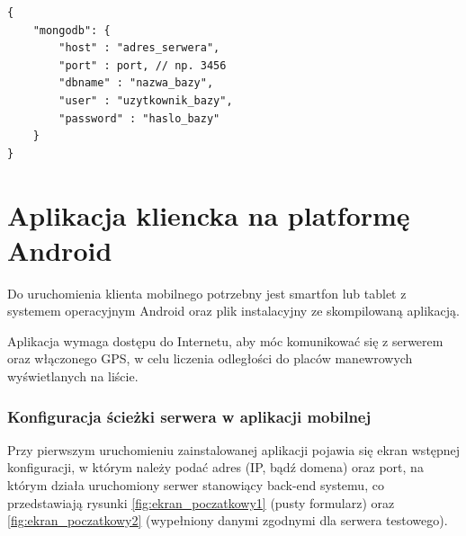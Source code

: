 \documentclass[twoside,a4paper,openright,12pt]{book}
\begin{document}
\begin{lstlisting}[frame=single,label={lst:dbconfig},caption=Domyślna zawartość pliku z konfiguracją połączenia do bazy danych -- plik: /config.json]
{
	"mongodb": {
		"host" : "adres_serwera",
		"port" : port, // np. 3456
		"dbname" : "nazwa_bazy",
		"user" : "uzytkownik_bazy",
		"password" : "haslo_bazy"
	}
}
\end{lstlisting}


\section{Aplikacja kliencka na platformę Android}

Do uruchomienia klienta mobilnego potrzebny jest smartfon lub tablet z systemem operacyjnym Android oraz plik instalacyjny ze skompilowaną aplikacją.

Aplikacja wymaga dostępu do Internetu, aby móc komunikować się z serwerem oraz włączonego GPS, w celu liczenia odległości do placów manewrowych wyświetlanych na liście.


\subsubsection{Konfiguracja ścieżki serwera w aplikacji mobilnej}
\label{konfiguracja_adresu_serwera}

Przy pierwszym uruchomieniu zainstalowanej aplikacji pojawia się ekran wstępnej konfiguracji, w którym należy podać adres (IP, bądź domena) oraz port, na którym działa uruchomiony serwer stanowiący back-end systemu, co przedstawiają rysunki \ref{fig:ekran_poczatkowy1} (pusty formularz) oraz \ref{fig:ekran_poczatkowy2} (wypełniony danymi zgodnymi dla serwera testowego).
\end{document}
